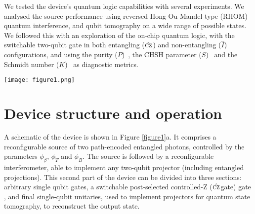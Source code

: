 \documentclass[
twocolumn,
 amsmath,amssymb,
 aps,
  twoside,
 superscriptaddress,
pra,
longbibliography
]{revtex4-1}
\begin{document}
We tested the device's quantum logic capabilities with several experiments. We analysed the source performance using reversed-Hong-Ou-Mandel-type (RHOM)~\cite{Chen:2007he, Silverstone:2013fu} quantum interference, and qubit tomography on a wide range of possible states. We followed this with an exploration of the on-chip quantum logic, with the switchable two-qubit gate in both entangling ($\hat{\textsc{cz}}$) and non-entangling ($\hat{I}$) configurations, and using the purity ($P$)~\cite{Gamel:2012hm}, the CHSH parameter ($S$)~\cite{Horodecki:2009gb} and the Schmidt number ($K$)~\cite{Terhal:2000gd} as diagnostic metrics. 


\begin{figure*}[t!]
\centering
\texttt{[image: figure1.png]}
\caption{Device and apparatus overview. \textbf{a}~Operating principles. \textbf{i}~Non-degenerate spontaneous four-wave mixing, \textbf{ii}~quantum circuit description. \textbf{b}~Schematic of the silicon quantum photonic chip. A pump laser is coupled into the device, coherently pumping two spiralled RHOM sources which produce two photons entangled or separable in path. These are fed into a reconfigurable linear optical network which can entangle or disentangle them, and analyse the output.  \textbf{c}~Off-chip apparatus. A continuous wave (CW) tunable laser source (TLS) is polarisation controlled (PC), amplified (EDFA), filtered and coupled onto the chip using lensed fibres and spot-size converters. Signal, idler, and pump photons coupled back into fibre in the same way, then spatially separated using dense wavelength-division multiplexers (DWDM), detected using superconducting nanowire single-photon detectors (SNSPD), and the output signal is analysed by a time interval analyser (TIA). \textbf{d}~Electron \textbf{i}~and optical \textbf{ii}~micrographs of the device.}
\label{figure1}
\end{figure*}


\section{Device structure and operation}

A schematic of the device is shown in Figure \ref{figure1}a. It comprises a reconfigurable source of two path-encoded entangled photons, controlled by the parameters $\phi_\beta$, $\phi_T$ and $\phi_B$. The source is followed by a reconfigurable interferometer, able to implement any two-qubit projector (including entangled projections). This second part of the device can be divided into three sections: arbitrary single qubit gates, a switchable post-selected controlled-Z ($\hat{\textsc{cz}}$gate) gate \cite{Ralph:2002id}, and final single-qubit unitaries, used to implement projectors for quantum state tomography, to reconstruct the output state.
\end{document}
